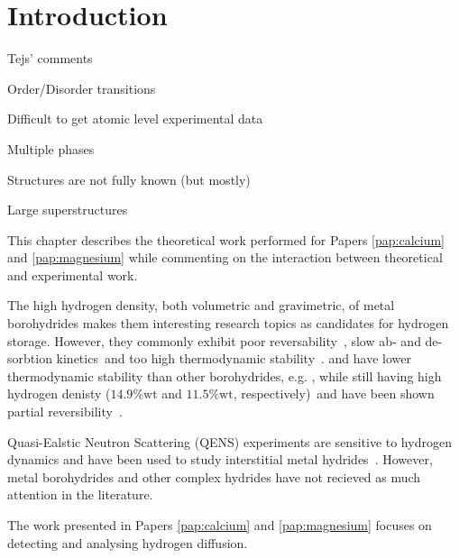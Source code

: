 \section{Introduction}
\label{sec:borohydrides-introduction}


Tejs' comments
\bit
\item Order/Disorder transitions
\item Difficult to get atomic level experimental data
\item Multiple phases
\item Structures are not fully known (but mostly)
\item Large superstructures
\eit

This chapter describes the theoretical work performed for Papers \ref{pap:calcium} and \ref{pap:magnesium} while commenting on the interaction between theoretical and experimental work.

The high hydrogen density, both volumetric and gravimetric, of metal borohydrides makes them interesting research topics as candidates for hydrogen storage.
However, they commonly exhibit poor reversability~\citemiss, slow ab- and de-sorbtion kinetics~\citemiss and too high thermodynamic stability~\citemiss.
 and  have lower thermodynamic stability than other borohydrides, e.g. , while still having high hydrogen denisty ($14.9\%\text{wt}$ and $11.5\%\text{wt}$, respectively)~\citemiss and have been shown partial reversibility~\citemiss.

Quasi-Ealstic Neutron Scattering (QENS) experiments are sensitive to hydrogen dynamics and have been used to study interstitial metal hydrides~\citemiss.
However, metal borohydrides and other complex hydrides have not recieved as much attention in the literature.

The work presented in Papers \ref{pap:calcium} and \ref{pap:magnesium} focuses on detecting and analysing hydrogen diffusion.






